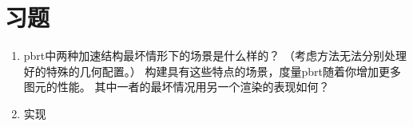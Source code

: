 \section{习题}\label{sec:习题04}

\begin{enumerate}
    \item \circletwo pbrt中两种加速结构最坏情形下的场景是什么样的？
          （考虑方法无法分别处理好的特殊的几何配置。）
          构建具有这些特点的场景，度量pbrt随着你增加更多图元的性能。
          其中一者的最坏情况用另一个渲染的表现如何？
    \item \circletwo 实现
\end{enumerate}